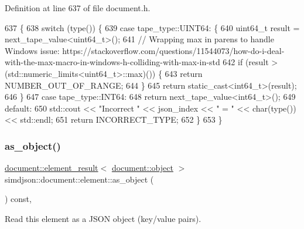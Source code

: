 Definition at line 637 of file document.\+h.


\begin{DoxyCode}
637                                                                                   \{
638   \textcolor{keywordflow}{switch} (type()) \{
639     \textcolor{keywordflow}{case} tape\_type::UINT64: \{
640       uint64\_t result = next\_tape\_value<uint64\_t>();
641       \textcolor{comment}{// Wrapping max in parens to handle Windows issue:
       https://stackoverflow.com/questions/11544073/how-do-i-deal-with-the-max-macro-in-windows-h-colliding-with-max-in-std}
642       \textcolor{keywordflow}{if} (result > (std::numeric\_limits<uint64\_t>::max)()) \{
643         \textcolor{keywordflow}{return} NUMBER\_OUT\_OF\_RANGE;
644       \}
645       \textcolor{keywordflow}{return} \textcolor{keyword}{static\_cast<}int64\_t\textcolor{keyword}{>}(result);
646     \}
647     \textcolor{keywordflow}{case} tape\_type::INT64:
648       \textcolor{keywordflow}{return} next\_tape\_value<int64\_t>();
649     \textcolor{keywordflow}{default}:
650     std::cout << \textcolor{stringliteral}{"Incorrect "} << json\_index << \textcolor{stringliteral}{" = "} << char(type()) << std::endl;
651       \textcolor{keywordflow}{return} INCORRECT\_TYPE;
652   \}
653 \}
\end{DoxyCode}
\mbox{\label{classsimdjson_1_1document_1_1element_a1fe44151506bca67f318f9f4aeb02fc6}} 
\subsubsection{\texorpdfstring{as\+\_\+object()}{as\_object()}}
{\footnotesize\ttfamily \hyperlink{classsimdjson_1_1document_1_1element__result}{document\+::element\+\_\+result}$<$ \hyperlink{classsimdjson_1_1document_1_1object}{document\+::object} $>$ simdjson\+::document\+::element\+::as\+\_\+object (\begin{DoxyParamCaption}{ }\end{DoxyParamCaption}) const\hspace{0.3cm}{\ttfamily [inline]}, {\ttfamily [noexcept]}}



Read this element as a J\+S\+ON object (key/value pairs). 

